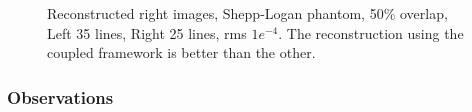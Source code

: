 \begin{enumerate}
\begin{figure}[t!]
\hspace{0.4in}
\hspace{0.2in}
\caption [Reconstructed right images, Shepp-Logan phantom, 50\% overlap,  Left 35 lines, Right 25 lines, rms $1e^{-4}$]{Reconstructed right images, Shepp-Logan phantom, 50\% overlap,  Left 35 lines, Right 25 lines, rms $1e^{-4}$. The reconstruction using the coupled framework is better than the other.}
\label{fig:expt310}
\end{figure}
\end{enumerate}

\subsubsection{Observations}


